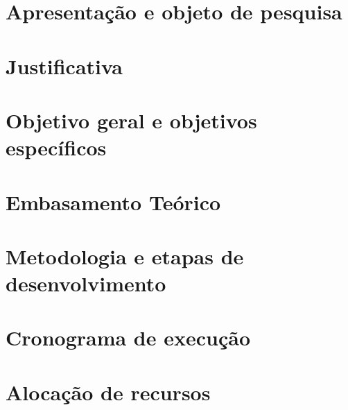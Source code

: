 \documentclass[
	12pt,				%
	openright,			%
	oneside,			%
	a4paper,			%
	chapter=TITLE,		%
	section=TITLE,		%
	english,			%
	french,				%
	spanish,			%
	brazil				%
	]{abntex2}
\begin{document}
\tableofcontents*
\cleardoublepage


\textual

\chapter[Apresentação e objeto de pesquisa]{Apresentação e objeto de pesquisa}


\chapter[Justificativa]{Justificativa}


\chapter[Objetivo geral e objetivos específicos]{Objetivo geral e objetivos específicos}


\chapter[Embasamento Teórico]{Embasamento Teórico}


\chapter[Metodologia e etapas de desenvolvimento]{Metodologia e etapas de desenvolvimento}


\chapter[Cronograma de execução]{Cronograma de execução}


\chapter[Alocação de recursos
]{Alocação de recursos}



\postextual

\end{document}

